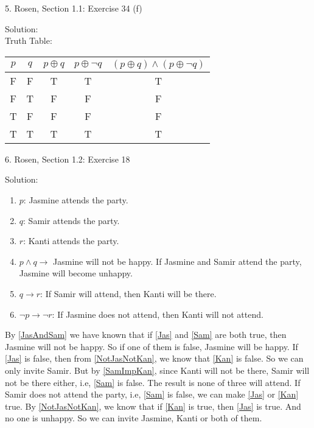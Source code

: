 \documentclass[12pt]{article}
\begin{document}
5. Rosen, Section 1.1: Exercise 34 (f)

\indent Solution:\\
\indent Truth Table:\\
\begin{center}
\begin{tabular}{c|c|c|c|c}
    $p$ & $q$ & $p \oplus q$ & $p \oplus \lnot q$ & $ (p \oplus q) \land (p \oplus \lnot q) $ \\
\hline
F & F & T & T & T \\
F & T & F & F & F \\
T & F & F & F & F \\
T & T & T & T & T \\
\end{tabular}
\end{center}

6. Rosen, Section 1.2: Exercise 18 

\indent Solution:\\
\begin{enumerate}
\item \label{Jas} $p$: Jasmine attends the party.
\item \label{Sam} $q$: Samir attends the party.
\item \label{Kan} $r$: Kanti attends the party.
\item \label{JasAndSam} $p \land q \to$ Jasmine will not be happy. If Jasmine and Samir attend the party, Jasmine will become unhappy.
\item \label{SamImpKan} $q \to r$: If Samir will attend, then Kanti will be there.
\item \label{NotJasNotKan} $\lnot p \to \lnot r$: If Jasmine does not attend, then Kanti will not attend.
\end{enumerate}

By \ref{JasAndSam} we have known that if \ref{Jas} and \ref{Sam} are both true, then Jasmine will not be happy. So if one of them is false, Jasmine will be happy. If \ref{Jas} is false, then from \ref{NotJasNotKan}, we know that \ref{Kan}  is false. So we can only invite Samir. But by \ref{SamImpKan}, since Kanti will not be there, Samir will not be there either, i.e, \ref{Sam}  is false. The result is none of three will attend. If Samir does not attend the party, i.e, \ref{Sam} is false, we can make \ref{Jas}  or \ref{Kan} true. By \ref{NotJasNotKan}, we know that if \ref{Kan} is true, then \ref{Jas} is true. And no one is unhappy. So we can invite Jasmine, Kanti or both of them.  
\newline
\end{document}
